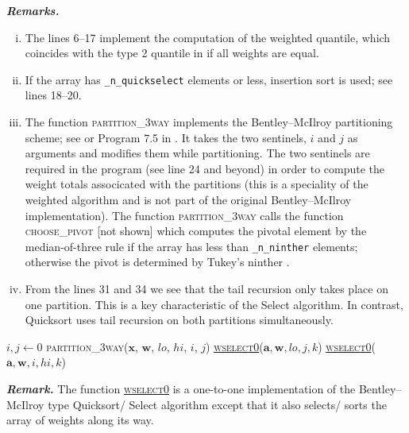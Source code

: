 \documentclass[a4paper,oneside,11pt,DIV=12]{scrartcl}
\newcommand{\code}[1]{{\texttt{#1}}}
\begin{document}
\vspace{1em}
\noindent\textbf{\sffamily \small \itshape Remarks.}
\begin{enumerate}[i)]
	\item The lines 6--17 implement the computation of the weighted quantile, which coincides with the type 2 quantile in \citet{hyndman_fan_1996} if all weights are equal.
	\item If the array has \code{\_n\_quickselect} elements or less, insertion sort is used; see lines 18--20.  
	\item The function \textsc{partition\_3way} implements the Bentley--McIlroy partitioning scheme; see \citet{bentley_mcilroy_1993} or Program 7.5 in \citet[][p. 326]{sedgewick_1997}. It takes the two sentinels, $i$ and $j$ as arguments and modifies them while partitioning. The two sentinels are required in the program (see line 24 and beyond) in order to compute the weight totals associcated with the partitions (this is a speciality of the weighted algorithm and is not part of the original Bentley--McIlroy implementation). The function \textsc{partition\_3way} calls the function \textsc{choose\_pivot} [not shown] which computes the pivotal element by the median-of-three rule \citep[see e.g.][Chap. 7.5]{sedgewick_1997} if the array has less than \code{\_n\_ninther} elements; otherwise the pivot is determined by Tukey's ninther \citep{bentley_mcilroy_1993}.
	\item From the lines 31 and 34 we see that the tail recursion only takes place on one partition. This is a key characteristic of the Select algorithm. In contrast, Quicksort uses tail recursion on both partitions simultaneously. 
\end{enumerate}


\begin{algorithmic}[1]
	\hypertarget{alg:wselect0}{}
			\State \Return
		\EndIf
		\State $i,j \gets 0$
		\State \textsc{partition\_3way($\bm x$, $\bm w$, $lo$, $hi$, $i$, $j$)}
			\State \hyperlink{alg:wselect0}{\textsc{wselect0}}($\bm a, \bm w, lo, j, k$)
			\State \hyperlink{alg:wselect0}{\textsc{wselect0}}($\bm a, \bm w, i, hi, k$)
		\EndIf	
	\EndFunction
\end{algorithmic}

\vspace{1em}
\noindent\textbf{\sffamily \small \itshape Remark.} The function \hyperlink{alg:wselect0}{\textsc{wselect0}} is a one-to-one implementation of the Bentley--McIlroy type Quicksort/ Select algorithm except that it also selects/ sorts the array of weights along its way.
\end{document}
